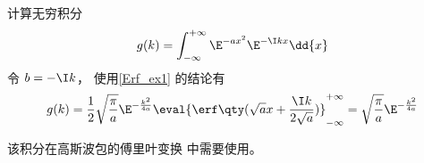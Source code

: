\begin{exam}{}
计算无穷积分
\begin{equation}
g(k) = \int_{-\infty}^{+\infty} \E^{-a x^2} \E^{-\I kx} \dd{x}
\end{equation}
令 $b = -\I k$， 使用\autoref{Erf_ex1} 的结论有
\begin{equation}
g(k) = \frac12 \sqrt{\frac{\pi}{a}} \E^{-\frac{k^2}{4a}} \eval{\erf\qty(\sqrt{a} x + \frac{\I k}{2\sqrt{a}})}_{-\infty}^{+\infty} = \sqrt{\frac{\pi}{a}} \E^{-\frac{k^2}{4a}}
\end{equation}

该积分在高斯波包的傅里叶变换%
中需要使用。
\end{exam}
